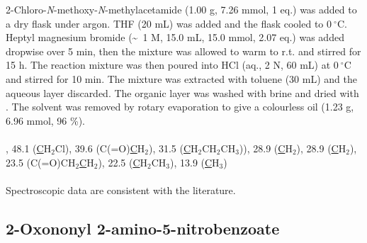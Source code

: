 {{{2-Chloro-\textit{N}-methoxy-\textit{N}-methylacetamide (1.00 g, 7.26 mmol, 1 eq.) was added to a dry flask under argon. THF (20 mL) was added and the flask cooled to $0\ ^{\circ}$C. Heptyl magnesium bromide (\textasciitilde ~1 M, 15.0 mL, 15.0 mmol, 2.07 eq.) was added dropwise over 5 min, then the mixture was allowed to warm to r.t. and stirred for 15 h. The reaction mixture was then poured into HCl (aq., 2 N, 60 mL) at $0\ ^{\circ}$C and stirred for 10 min. The mixture was extracted with toluene (30 mL) and the aqueous layer discarded. The organic layer was washed with brine and dried with . The solvent was removed by rotary evaporation to give a colourless oil (1.23 g, 6.96 mmol, 96 \%).
\\[1\baselineskip]
\\[1\baselineskip]
, 
48.1 (\underline{C}H$_2$Cl), 
39.6 (C(=O)\underline{C}H$_2$), 
31.5 (\underline{C}H$_2$CH$_2$CH$_3$)), 
28.9 (\underline{C}H$_2$),
28.9 (\underline{C}H$_2$), 
23.5 (C(=O)CH$_2$\underline{C}H$_2$), 
22.5 (\underline{C}H$_2$CH$_3$), 
13.9 (\underline{C}H$_3$)}
\\[1\baselineskip]
\\[1\baselineskip]
Spectroscopic data are consistent with the literature\cite{Hodgkinson2011}.


\subsection{2-Oxononyl 2-amino-5-nitrobenzoate }

}}
